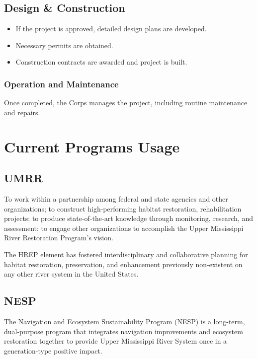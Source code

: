 \documentclass[
  letterpaper,
  DIV=11,
  numbers=noendperiod]{scrreprt}
\providecommand{\tightlist}{%
  \setlength{\itemsep}{0pt}\setlength{\parskip}{0pt}}
\begin{document}
\subsection{Design \& Construction}\label{design-construction}

\begin{itemize}
\tightlist
\item
  If the project is approved, detailed design plans are developed.
\item
  Necessary permits are obtained.
\item
  Construction contracts are awarded and project is built.
\end{itemize}

\subsubsection{Operation and
Maintenance}\label{operation-and-maintenance}

Once completed, the Corps manages the project, including routine
maintenance and repairs.

\section{Current Programs Usage}\label{current-programs-usage}

\subsection{UMRR}\label{umrr}

To work within a partnership among federal and state agencies and other
organizations; to construct high-performing habitat restoration,
rehabilitation projects; to produce state-of-the-art knowledge through
monitoring, research, and assessment; to engage other organizations to
accomplish the Upper Mississippi River Restoration Program's vision.

The HREP element has fostered interdisciplinary and collaborative
planning for habitat restoration, preservation, and enhancement
previously non-existent on any other river system in the United States.

\subsection{NESP}\label{nesp}

The Navigation and Ecosystem Sustainability Program (NESP) is a
long-term, dual-purpose program that integrates navigation improvements
and ecosystem restoration together to provide Upper Mississippi River
System once in a generation-type positive impact.
\end{document}
